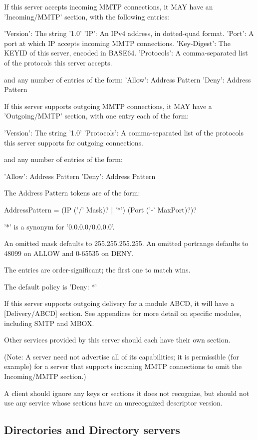 If this server accepts incoming MMTP connections, it MAY have an
'Incoming/MMTP' section, with the following entries:

     'Version': The string '1.0'
     'IP': An IPv4 address, in dotted-quad format.
     'Port': A port at which IP accepts incoming MMTP connections.
     'Key-Digest': The KEYID of this server, encoded in BASE64.
     'Protocols': A comma-separated list of the protocols this
           server accepts.

and any number of entries of the form:
     'Allow': Address Pattern
     'Deny': Address Pattern

If this server supports outgoing MMTP connections, it MAY have a
'Outgoing/MMTP' section, with one entry each of the form:

      'Version': The string '1.0'
      'Protocols': A comma-separated list of the protocols this server
           supports for outgoing connections.

and any number of entries of the form:

      'Allow': Address Pattern
      'Deny': Address Pattern

The Address Pattern tokens are of the form:

   AddressPattern = (IP ('/' Mask)? | '*') (Port ('-' MaxPort)?)?

'*' is a synonym for '0.0.0.0/0.0.0.0'.

An omitted mask defaults to 255.255.255.255.  An omitted portrange
defaults to 48099 on ALLOW and 0-65535 on DENY.

The entries are order-significant; the first one to match wins.

The default policy is 'Deny: *'

If this server supports outgoing delivery for a module ABCD, it will
have a [Delivery/ABCD] section.  See appendices for more detail on
specific modules, including SMTP and MBOX.

Other services provided by this server should each have their own section.

(Note: A server need not advertise all of its capabilities; it is
permissible (for example) for a server that supports incoming MMTP
connections to omit the Incoming/MMTP section.)

A client should ignore any keys or sections it does not recognize, but
should not use any service whose sections have an unrecognized
descriptor version.

\subsection{Directories and Directory servers}

